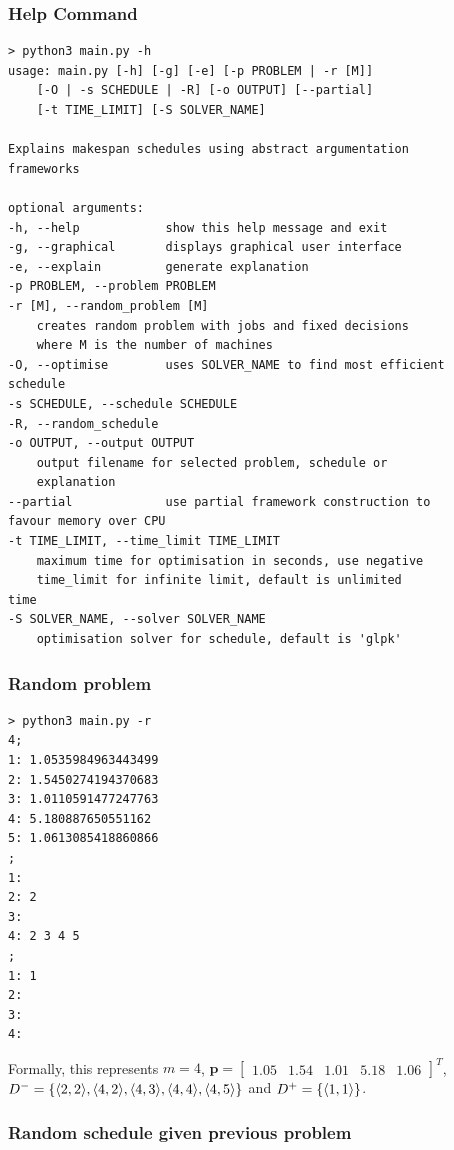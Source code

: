 \subsubsection{Help Command}

\begin{verbatim}
> python3 main.py -h
usage: main.py [-h] [-g] [-e] [-p PROBLEM | -r [M]]
    [-O | -s SCHEDULE | -R] [-o OUTPUT] [--partial]
    [-t TIME_LIMIT] [-S SOLVER_NAME]

Explains makespan schedules using abstract argumentation
frameworks

optional arguments:
-h, --help            show this help message and exit
-g, --graphical       displays graphical user interface
-e, --explain         generate explanation
-p PROBLEM, --problem PROBLEM
-r [M], --random_problem [M]
    creates random problem with jobs and fixed decisions
    where M is the number of machines
-O, --optimise        uses SOLVER_NAME to find most efficient
schedule
-s SCHEDULE, --schedule SCHEDULE
-R, --random_schedule
-o OUTPUT, --output OUTPUT
    output filename for selected problem, schedule or
    explanation
--partial             use partial framework construction to
favour memory over CPU
-t TIME_LIMIT, --time_limit TIME_LIMIT
    maximum time for optimisation in seconds, use negative
    time_limit for infinite limit, default is unlimited
time
-S SOLVER_NAME, --solver SOLVER_NAME
    optimisation solver for schedule, default is 'glpk'
\end{verbatim}

\subsubsection{Random problem}

\begin{verbatim}
> python3 main.py -r
4;
1: 1.0535984963443499
2: 1.5450274194370683
3: 1.0110591477247763
4: 5.180887650551162
5: 1.0613085418860866
;
1: 
2: 2
3: 
4: 2 3 4 5
;
1: 1
2: 
3: 
4: 
\end{verbatim}

Formally, this represents $m=4$, $\mathbf{p}=\begin{bmatrix}
	1.05&1.54&1.01&5.18&1.06
\end{bmatrix}^T$, $D^-=\{\langle{2},{2}\rangle,\langle{4},{2}\rangle,\langle{4},{3}\rangle,\langle{4},{4}\rangle,\langle{4},{5}\rangle\}$ and $D^+=\{\langle{1},{1}\rangle\}$.

\subsubsection{Random schedule given previous problem}

